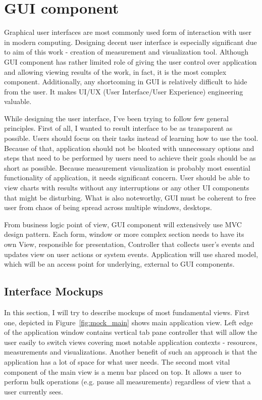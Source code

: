 %
\section{GUI component}
\label{sec:arch_gui}

Graphical user interfaces are most commonly used form of interaction with user in modern computing. Designing decent user interface is especially significant due to aim of this work - creation of measurement and visualization tool. Although GUI component has rather limited role of giving the user control over application and allowing viewing results of the work, in fact, it is the most complex component. Additionally, any shortcoming in GUI is relatively difficult to hide from the user. It makes UI/UX (User Interface/User Experience) engineering valuable.

While designing the user interface, I've been trying to follow few general principles. First of all, I wanted to result interface to be as transparent as possible. Users should focus on their tasks instead of learning how to use the tool. Because of that, application should not be bloated with unnecessary options and steps that need to be performed by users need to achieve their goals should be as short as possible. Because measurement visualization is probably most essential functionality of application, it needs significant concern. User should be able to view charts with results without any interruptions or any other UI components that might be disturbing. What is also noteworthy, GUI must be coherent to free user from chaos of being spread across multiple windows, desktops.

From business logic point of view, GUI component will extensively use MVC design pattern\cite{gamma1995}. Each form, window or more complex section needs to have its own View, responsible for presentation, Controller that collects user's events and updates view on user actions or system events. Application will use shared model, which will be an access point for underlying, external to GUI components.

\subsection{Interface Mockups}

In this section, I will try to describe mockups of most fundamental views. First one, depicted in Figure~\ref{fig:mock_main} shows main application view. Left edge of the application window contains vertical tab pane controller that will allow the user easily to switch views covering most notable application contexts - resources, measurements and visualizations. Another benefit of such an approach is that the application has a lot of space for what user needs. The second most vital component of the main view is a menu bar placed on top. It allows a user to perform bulk operations (e.g. pause all measurements) regardless of view that a user currently sees.

